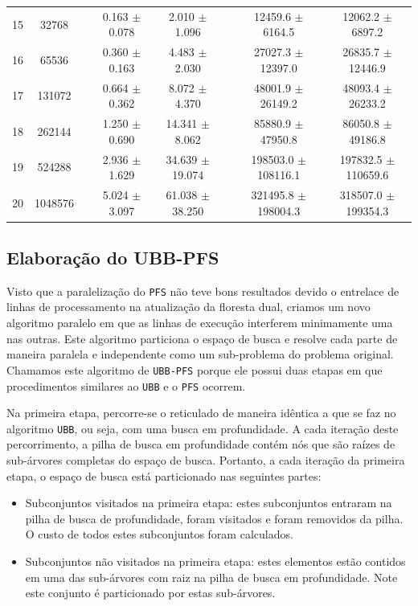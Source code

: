 \documentclass[12pt]{article}
\newcommand{\algname}[1]{\texttt{#1}}
\begin{document}
\begin{table}
\begin{tabular}{cc c cc c cc}
15 &   32768 && 0.163 $\pm$ 0.078 & 2.010 $\pm$ 1.096 && 12459.6 $\pm$ 6164.5 & 12062.2 $\pm$ 6897.2 \\
16 &   65536 && 0.360 $\pm$ 0.163 & 4.483 $\pm$ 2.030 && 27027.3 $\pm$ 12397.0 & 26835.7 $\pm$ 12446.9 \\
17 &  131072 && 0.664 $\pm$ 0.362 & 8.072 $\pm$ 4.370 && 48001.9 $\pm$ 26149.2 & 48093.4 $\pm$ 26233.2 \\
18 &  262144 && 1.250 $\pm$ 0.690 & 14.341 $\pm$ 8.062 && 85880.9 $\pm$ 47950.8 & 86050.8 $\pm$ 49186.8 \\
19 &  524288 && 2.936 $\pm$ 1.629 & 34.639 $\pm$ 19.074 && 198503.0 $\pm$ 108116.1 & 197832.5 $\pm$ 110659.6 \\
20 & 1048576 && 5.024 $\pm$ 3.097 & 61.038 $\pm$ 38.250 && 321495.8 $\pm$ 198004.3 & 318507.0 $\pm$ 199354.3 \\
\bottomrule
\end{tabular}
\end{table}


\subsection{Elaboração do UBB-PFS}
Visto que a paralelização do \algname{PFS} não teve bons resultados 
devido o entrelace de linhas de processamento na atualização da floresta 
dual, criamos um novo algoritmo paralelo em que as linhas de execução
interferem minimamente uma nas outras. Este algoritmo particiona o 
espaço de busca e resolve cada parte de maneira paralela e independente
como um sub-problema do problema original. Chamamos este algoritmo de 
\algname{UBB-PFS} porque ele possui duas etapas em que procedimentos 
similares ao \algname{UBB} e o \algname{PFS} ocorrem. 

Na primeira etapa, percorre-se o reticulado de maneira idêntica a que 
se faz no algoritmo \algname{UBB}, ou seja, com uma busca em
profundidade. A cada iteração deste percorrimento, a pilha de busca em 
profundidade contém nós que são raízes de sub-árvores completas do
espaço de busca. Portanto, a cada iteração da primeira etapa, o espaço
de busca está particionado nas seguintes partes:
\begin{itemize}
    \item{Subconjuntos visitados na primeira etapa: estes subconjuntos
        entraram na pilha de busca de profundidade, foram visitados e 
        foram removidos da pilha. O custo de todos estes subconjuntos 
        foram calculados.}
    \item{Subconjuntos não visitados na primeira etapa: estes elementos
        estão contidos em uma das sub-árvores com raiz na pilha de
        busca em profundidade. Note este conjunto é particionado por
        estas sub-árvores.}
\end{itemize}
\end{document}
